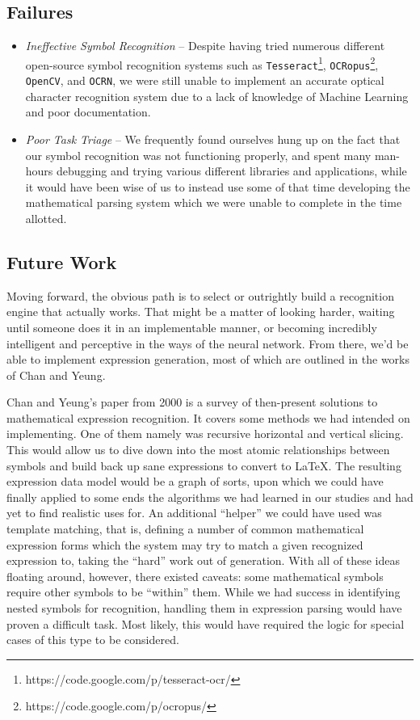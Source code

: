 \documentclass{acm_proc_article-sp}
\begin{document}
\subsection{Failures}
\begin{itemize}
	\item{\emph{Ineffective Symbol Recognition}} -- Despite having tried numerous different open-source symbol recognition systems such as \texttt{Tesseract}\footnote{https://code.google.com/p/tesseract-ocr/}, \texttt{OCRopus}\footnote{https://code.google.com/p/ocropus/}, \texttt{OpenCV}, and \texttt{OCRN}, we were still unable to implement an accurate optical character recognition system due to a lack of knowledge of Machine Learning and poor documentation.
	\item{\emph{Poor Task Triage}} -- We frequently found ourselves hung up on the fact that our symbol recognition was not functioning properly, and spent many man-hours debugging and trying various different libraries and applications, while it would have been wise of us to instead use some of that time developing the mathematical parsing system which we were unable to complete in the time allotted.

	
	\end{itemize}

\subsection{Future Work}
Moving forward, the obvious path is to select or outrightly build a recognition engine that actually works. That might be a matter of looking harder, waiting until someone does it in an implementable manner, or becoming incredibly intelligent and perceptive in the ways of the neural network. From there, we'd be able to implement expression generation, most of which are outlined in the works of Chan and Yeung\cite{chan_mathematical_2000}. 

Chan and Yeung's paper from 2000 is a survey of then-present solutions to mathematical expression recognition. It covers some methods we had intended on implementing. One of them namely was recursive horizontal and vertical slicing. This would allow us to dive down into the most atomic relationships between symbols and build back up sane expressions to convert to \LaTeX{}. The resulting expression data model would be a graph of sorts, upon which we could have finally applied to some ends the algorithms we had learned in our studies and had yet to find realistic uses for. An additional ``helper'' we could have used was template matching, that is, defining a number of common mathematical expression forms which the system may try to match a given recognized expression to, taking the ``hard'' work out of generation. With all of these ideas floating around, however, there existed caveats: some mathematical symbols require other symbols to be ``within'' them. While we had success in identifying nested symbols for recognition, handling them in expression parsing would have proven a difficult task. Most likely, this would have required the logic for special cases of this type to be considered.
\end{document}
